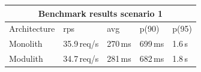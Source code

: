 \begin{tabular}{ |p{3cm}||p{1.5cm}|p{1.5cm}|p{1.5cm}|p{1.5cm}| }
    \hline
    \multicolumn{5}{|c|}{Benchmark results scenario 1}      \\
    \hline
    Architecture & rps         & avg     & p(90)   & p(95)  \\
    \hline
    Monolith     & 35.9\,req/s & 270\,ms & 699\,ms & 1.6\,s \\
    Modulith     & 34.7\,req/s & 281\,ms & 682\,ms & 1.8\,s \\
    \hline
\end{tabular}

% 




